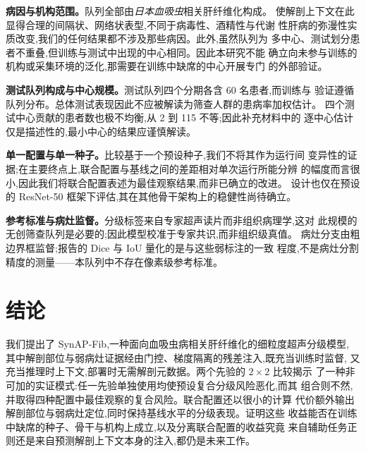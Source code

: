 \textbf{病因与机构范围。}队列全部由\emph{日本血吸虫}相关肝纤维化构成。
使解剖上下文在此显得合理的间隔状、网络状表型,不同于病毒性、酒精性与代谢
性肝病的弥漫性实质改变,我们的任何结果都不涉及那些病因。此外,虽然队列为
多中心、测试划分患者不重叠,但训练与测试中出现的中心相同。因此本研究不能
确立向未参与训练的机构或采集环境的泛化,那需要在训练中缺席的中心开展专门
的外部验证。

\textbf{测试队列构成与中心规模。}测试队列四个分期各含 60 名患者,而训练与
验证遵循队列分布。总体测试表现因此不应被解读为筛查人群的患病率加权估计。
四个测试中心贡献的患者数也极不均衡,从 2 到 115 不等;因此补充材料中的
逐中心估计仅是描述性的,最小中心的结果应谨慎解读。

\textbf{单一配置与单一种子。}比较基于一个预设种子,我们不将其作为运行间
变异性的证据;在主要终点上,联合配置与基线之间的差距相对单次运行所能分辨
的幅度而言很小,因此我们将联合配置表述为最佳观察结果,而非已确立的改进。
设计也仅在预设的 ResNet-50 框架下评估,其在其他骨干架构上的稳健性尚待确立。

\textbf{参考标准与病灶监督。}分级标签来自专家超声读片而非组织病理学,这对
此规模的无创筛查队列是必要的;因此模型校准于专家共识,而非组织级真值。
病灶分支由粗边界框监督;报告的 Dice 与 IoU 量化的是与这些弱标注的一致
程度,不是病灶分割精度的测量——本队列中不存在像素级参考标准。

\section{结论}
\label{sec:conclusion}

我们提出了 SynAP-Fib,一种面向血吸虫病相关肝纤维化的细粒度超声分级模型,
其中解剖部位与弱病灶证据经由门控、梯度隔离的残差注入,既充当训练时监督,
又充当推理时上下文,部署时无需解剖元数据。两个先验的 $2\times2$ 比较揭示
了一种非可加的实证模式:任一先验单独使用均使预设复合分级风险恶化,而其
组合则不然,并取得四种配置中最佳观察的复合风险。联合配置还以很小的计算
代价额外输出解剖部位与弱病灶定位,同时保持基线水平的分级表现。证明这些
收益能否在训练中缺席的种子、骨干与机构上成立,以及分离联合配置的收益究竟
来自辅助任务正则还是来自预测解剖上下文本身的注入,都仍是未来工作。
